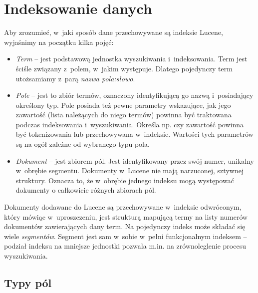 \section{Indeksowanie danych}

Aby zrozumieć, w~jaki sposób dane przechowywane są indeksie Lucene, wyjaśnimy na początku kilka pojęć:
\begin{itemize}
 \item \emph{Term} -- jest podstawową jednostka wyszukiwania i~indeksowania. Term jest ściśle związany z~polem, w~jakim występuje. Dlatego pojedynczy term utożsamiamy z~parą \emph{nazwa pola:słowo}.
 \item \emph{Pole} -- jest to zbiór termów, oznaczony identyfikującą go nazwą i~posiadający określony typ. Pole posiada też pewne parametry wskazujące, jak jego zawartość (lista należących do niego termów) powinna być traktowana podczas indeksowania i~wyszukiwania. Określa np. czy zawartość powinna być tokenizowania lub przechowywana w~indeksie. Wartości tych parametrów są na ogół zależne od wybranego typu pola.
 \item \emph{Dokument} -- jest zbiorem pól. Jest identyfikowany przez swój numer, unikalny w~obrębie segmentu. Dokumenty w~Lucene nie mają narzuconej, sztywnej struktury. Oznacza to, że w~obrębie jednego indeksu mogą występować dokumenty o całkowicie różnych zbiorach pól. 
\end{itemize}

Dokumenty dodawane do Lucene są przechowywane w~indeksie odwróconym, który mówiąc w~uproszczeniu, jest strukturą mapującą termy na listy numerów dokumentów zawierających dany term. Na pojedynczy indeks może składać się wiele \emph{segmentów}. Segment jest sam w~sobie w~pełni funkcjonalnym indeksem -- podział indeksu na mniejsze jednostki pozwala m.in. na zrównoleglenie procesu wyszukiwania.

\subsection{Typy pól}

